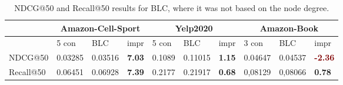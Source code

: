 \begin{table*}[h!]
    \centering
    \begin{tabular}{|l|r|r|r||l|r|r||l|l|l|}
        \hline
                  & \multicolumn{3}{c||}{Amazon-Cell-Sport} & \multicolumn{3}{c||}{Yelp2020} & \multicolumn{3}{c|}{Amazon-Book}                                                                                                                                              \\ \hline
                  & \multicolumn{1}{l|}{5 con}              & \multicolumn{1}{l|}{BLC}       & \multicolumn{1}{l||}{impr}            & 5 con  & \multicolumn{1}{l|}{BLC} & \multicolumn{1}{l||}{impr}            & 3 con   & BLC     & impr                                  \\ \hline
        NDCG@50   & 0.03285                                 & 0.03516                        & \textbf{\textcolor{OliveGreen}{7.03}} & 0.1089 & 0.11015                  & \textbf{\textcolor{OliveGreen}{1.15}} & 0.04647 & 0.04537 & \textbf{\textcolor{Maroon}{-2.36}}    \\ \hline
        Recall@50 & 0.06451                                 & 0.06928                        & \textbf{\textcolor{OliveGreen}{7.39}} & 0.2177 & 0.21917                  & \textbf{\textcolor{OliveGreen}{0.68}} & 0,08129 & 0,08066 & \textbf{\textcolor{OliveGreen}{0.78}} \\ \hline
    \end{tabular}
    \caption{NDCG@50 and Recall@50 results for BLC, where it was not based on the node degree.}
    \label{tab:balanced-layer-effect}
\end{table*}

